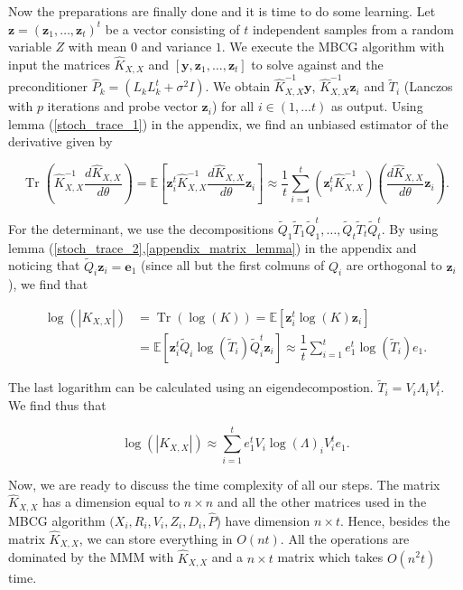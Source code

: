 \documentclass[12pt,a4paper,oneside]{book}
\DeclareMathOperator{\Tr}{Tr}
\begin{document}
Now the preparations are finally done and it is time to do some learning. Let $\bm{z} = (\bm{z}_1, \ldots, \bm{z}_t)^t$ be a vector consisting of $t$ independent samples from a random variable $Z$ with mean $0$ and variance $1$. We execute the MBCG algorithm with input the matrices $\hat{K}_{X,X}$ and $[\bm{y}, \bm{z}_1, \ldots, \bm{z}_t]$ to solve against and the preconditioner  $\hat{P}_k = (L_k L_k^t + \sigma^2 I)$. We obtain $\hat{K}_{X,X}^{-1} \bm{y}$, $\hat{K}_{X,X}^{-1} \bm{z}_i$ and $\tilde{T}_i$ (Lanczos with $p$ iterations and probe vector $\bm{z}_i$) for all $i \in (1, \ldots t)$ as output. Using lemma (\ref{stoch_trace_1}) in the appendix, we find an unbiased estimator of the derivative given by 

\begin{equation}\label{equation_trace}
\Tr \left( \hat{K}_{X,X}^{-1} \dfrac{d\hat{K}_{X,X}}{d\theta} \right) = \mathbb{E} \left[ \bm{z}_i^t \hat{K}_{X,X}^{-1} \dfrac{d\hat{K}_{X,X}}{d\theta} \bm{z}_i \right] \approx \dfrac{1}{t} \sum\limits_{i=1}^t ( \bm{z}_i^t \hat{K}_{X,X}^{-1} ) \left( \dfrac{d\hat{K}_{X,X}}{d\theta} \bm{z}_i \right).
\end{equation}

For the determinant, we use the decompositions $ \tilde{Q}_1 \tilde{T}_1 \tilde{Q}_1^t , \ldots,\tilde{Q}_t \tilde{T}_t \tilde{Q}_t^t $. By using lemma (\ref{stoch_trace_2},\ref{appendix_matrix_lemma}) in the appendix and noticing that $\tilde{Q}_i \bm{z}_i = \bm{e}_1$ (since all but the first colmuns of $Q_i$ are orthogonal to $\bm{z}_i$), we find that 

\begin{align}\label{appendix_stoch_tr_approx}
\log(|K_{X,X}|) &= \Tr (\log (K)) = \mathbb{E}[ \bm{z}_i^t \log (K)\bm{z}_i ] \nonumber \\ &= \mathbb{E}[ \bm{z}_i^t \tilde{Q}_i \log (\tilde{T}_i) \tilde{Q}_i^t  \bm{z}_i ] \approx \dfrac{1}{t} \sum\limits_{i=1}^t e_1^t \log (\tilde{T}_i) e_1.
\end{align}

The last logarithm can be calculated using an eigendecompostion. $\tilde{T}_i = V_i \Lambda_i V_i^{t}$. We find thus that 

\begin{equation}\label{equation_bbmm_einde}
\log(|K_{X,X}|) \approx \sum\limits_{i=1}^t e_1^t V_i \log {(\Lambda)_i} V^{t}_i e_1.
\end{equation} 

Now, we are ready to discuss the time complexity of all our steps. The matrix $\hat{K}_{X,X}$ has a dimension equal to $n \times n$ and all the other matrices used in the MBCG algorithm $(X_i, R_i,V_i,Z_i,D_i, \hat{P}$) have dimension $n \times t$. Hence, besides the matrix $\hat{K}_{X,X}$, we can store everything in $O(nt)$.  All the operations are dominated by the MMM with $\hat{K}_{X,X}$ and a $n \times t$ matrix which takes $O(n^2t)$ time.  
\end{document}
